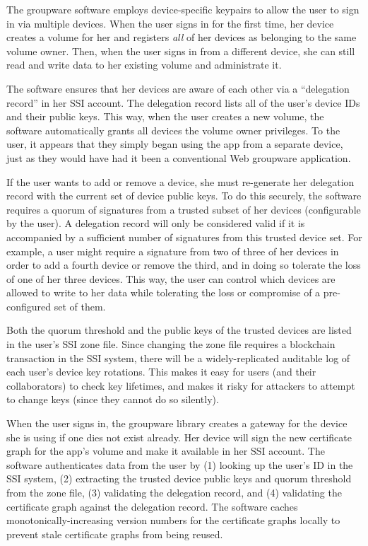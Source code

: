 The groupware software employs device-specific keypairs to allow the user to
sign in via multiple devices.  When the user signs in for the first time, her
device creates a volume for her and registers \emph{all} of her devices as
belonging to the same volume owner.  Then, when the user signs in from a different device, she can
still read and write data to her existing volume and administrate it.

The software ensures that her devices are aware of each other via a
``delegation record'' in her SSI account.  The delegation record lists all of
the user's device IDs and their public keys.  This way, when the user creates a
new volume, the software automatically grants all devices the volume owner
privileges.  To the user, it appears that they simply began using the app from a
separate device, just as they would have had it been a conventional Web
groupware application.

If the user wants to add or remove a device, she must re-generate her delegation
record with the current set of device public keys.
To do this securely, the software requires a quorum of signatures from a trusted
subset of her devices (configurable by the user).
A delegation record will only be considered valid if it
is accompanied by a sufficient number of signatures from this trusted device
set.  For example, a user might require a signature from two of three of her
devices in order to add a fourth device or remove the third, and in doing so
tolerate the loss of one of her three devices.  This way, the user can control
which devices are allowed to write to her data while tolerating the loss or
compromise of a pre-configured set of them.

Both the quorum threshold and the public keys of the
trusted devices are listed in the user's SSI zone file.  Since changing the zone
file requires a blockchain transaction in the SSI system, there will be a
widely-replicated auditable log of each user's device key rotations.  This makes it
easy for users (and their collaborators) to check key lifetimes, and makes it
risky for attackers to attempt to change keys (since they cannot do so
silently).

When the user signs in, the groupware library creates a gateway for the device
she is using if one dies not exist already.  Her device will sign the
new certificate graph for the app's volume and make it available in her SSI account.  The
software authenticates data from the user by (1) looking up the user's ID in the
SSI system, (2) extracting the trusted device public keys and quorum threshold
from the zone file, (3) validating the delegation record, and (4) validating the
certificate graph against the delegation record.  The software caches
monotonically-increasing version numbers for the certificate graphs locally to
prevent stale certificate graphs from being reused.

